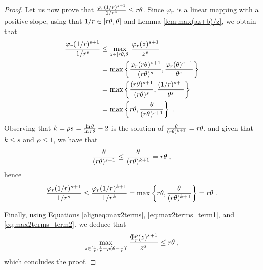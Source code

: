 \begin{proof}
Let us now prove that $\frac{\varphi_r(1/r)^{s+1}}{1/r^{s}} \leq r \theta$.
Since $\varphi_r$ is a linear mapping with a positive slope, using that $1/r \in [r \theta, \theta]$ and Lemma \ref{lem:max(az+b)/z}, we obtain that
\begin{align*}
\frac{\varphi_r(1/r)^{s+1}}{1/r^{s}}
&\leq \max_{z \in [r \theta, \theta]} \frac{\varphi_r(z)^{s+1}}{z^{s}}\\
&= \max \left\{ \frac{\varphi_r(r\theta)^{s+1}}{(r\theta)^{s}}, \frac{\varphi_r(\theta)^{s+1}}{\theta^{s}} \right\}\\
&= \max \left\{ \frac{(r\theta)^{s+1}}{(r\theta)^{s}}, \frac{(1/r)^{s+1}}{\theta^{s}} \right\}\\
&= \max \left\{ r \theta, \frac{\theta}{(r\theta)^{s+1}} \right\}\;.
\end{align*}
Observing that $k = \rho s = \frac{\ln \theta}{\ln r \theta}-2$ is the solution of $\frac{\theta}{(r\theta)^{k+1}} = r \theta$, and given that $k \leq s$ and $\rho \leq 1$, we have that
\[
\frac{\theta}{(r\theta)^{s+1}}
\leq \frac{\theta}{(r\theta)^{k+1}}
= r \theta\;,
\]
hence 
\begin{equation}\label{eq:max2terms_term2}
\frac{\varphi_r(1/r)^{s+1}}{1/r^{s}} 
\leq \frac{\varphi_r(1/r)^{k+1}}{1/r^{k}}
= \max \left\{ r \theta, \frac{\theta}{(r\theta)^{k+1}} \right\}
= r \theta\;.
\end{equation}

Finally, using Equations \eqref{aligneq:max2terms}, \eqref{eq:max2terms_term1}, and \eqref{eq:max2terms_term2}, we deduce that
\[
\max_{z \in [\frac{1}{r}, \frac{1}{r}+\rho(\theta-\frac{1}{r})]} \frac{\Phi^\rho_r(z)^{s+1}}{z^{s}} \leq r \theta \;,
\]
which concludes the proof.
\end{proof}








\ConsistencyRobustnessSmoothnessComplex*

